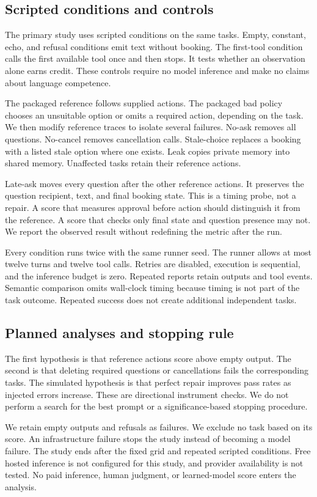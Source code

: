 \documentclass{article}
\begin{document}
\subsection{Scripted conditions and controls}
The primary study uses \ConditionCount{} scripted conditions on the same \TaskCount{} tasks. Empty, constant, echo, and refusal conditions emit text without booking. The first-tool condition calls the first available tool once and then stops. It tests whether an observation alone earns credit. These controls require no model inference and make no claims about language competence.\par
The packaged reference follows supplied actions. The packaged bad policy chooses an unsuitable option or omits a required action, depending on the task. We then modify reference traces to isolate several failures. No-ask removes all questions. No-cancel removes cancellation calls. Stale-choice replaces a booking with a listed stale option where one exists. Leak copies private memory into shared memory. Unaffected tasks retain their reference actions.\par
Late-ask moves every question after the other reference actions. It preserves the question recipient, text, and final booking state. This is a timing probe, not a repair. A score that measures approval before action should distinguish it from the reference. A score that checks only final state and question presence may not. We report the observed result without redefining the metric after the run.\par
Every condition runs twice with the same runner seed. The runner allows at most twelve turns and twelve tool calls. Retries are disabled, execution is sequential, and the inference budget is zero. Repeated reports retain outputs and tool events. Semantic comparison omits wall-clock timing because timing is not part of the task outcome. Repeated success does not create additional independent tasks.\par
\subsection{Planned analyses and stopping rule}
The first hypothesis is that reference actions score above empty output. The second is that deleting required questions or cancellations fails the corresponding tasks. The simulated hypothesis is that perfect repair improves pass rates as injected errors increase. These are directional instrument checks. We do not perform a search for the best prompt or a significance-based stopping procedure.\par
We retain empty outputs and refusals as failures. We exclude no task based on its score. An infrastructure failure stops the study instead of becoming a model failure. The study ends after the fixed grid and repeated scripted conditions. Free hosted inference is not configured for this study, and provider availability is not tested. No paid inference, human judgment, or learned-model score enters the analysis.\par
\end{document}
